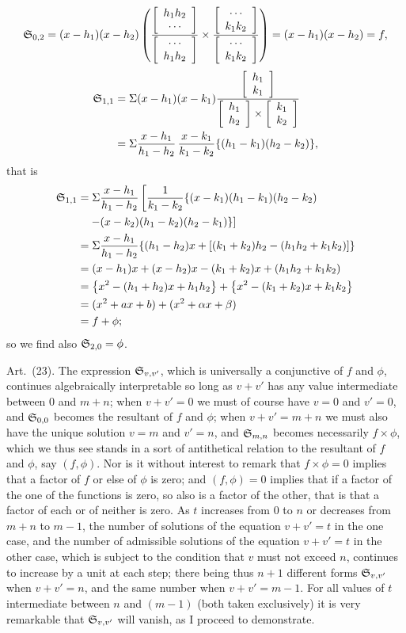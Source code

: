 \documentclass[11pt]{article}
\newcommand{\sourcepage}[1]{\marginpar{\scriptsize p.~#1}}
\newcommand{\art}[1]{\par\smallskip\noindent Art.~(#1).\quad}
\begin{document}
\sourcepage{469}
\[
\mathfrak{S}_{0,2}=(x-h_1)(x-h_2)
\left(\frac{\left[\begin{array}{c}h_1h_2\\\cdots\end{array}\right]}{\left[\begin{array}{c}\cdots\\h_1h_2\end{array}\right]}\times
\frac{\left[\begin{array}{c}\cdots\\k_1k_2\end{array}\right]}{\left[\begin{array}{c}\cdots\\k_1k_2\end{array}\right]}\right)=(x-h_1)(x-h_2)=f,
\]
\[
\begin{aligned}
\mathfrak{S}_{1,1}&=\Sigma(x-h_1)(x-k_1)
\frac{\left[\begin{array}{c}h_1\\k_1\end{array}\right]}{\left[\begin{array}{c}h_1\\h_2\end{array}\right]\times\left[\begin{array}{c}k_1\\k_2\end{array}\right]}\\
&=\Sigma\frac{x-h_1}{h_1-h_2}\,\frac{x-k_1}{k_1-k_2}\{(h_1-k_1)(h_2-k_2)\},
\end{aligned}
\]
that is
\[
\begin{aligned}
\mathfrak{S}_{1,1}
&=\Sigma\frac{x-h_1}{h_1-h_2}\left[\frac1{k_1-k_2}\{(x-k_1)(h_1-k_1)(h_2-k_2)\right.\\
&\quad\left.-(x-k_2)(h_1-k_2)(h_2-k_1)\}\right]\\
&=\Sigma\frac{x-h_1}{h_1-h_2}\{(h_1-h_2)x+[(k_1+k_2)h_2-(h_1h_2+k_1k_2)]\}\\
&=(x-h_1)x+(x-h_2)x-(k_1+k_2)x+(h_1h_2+k_1k_2)\\
&=\bigl\{x^2-(h_1+h_2)x+h_1h_2\bigr\}+\bigl\{x^2-(k_1+k_2)x+k_1k_2\bigr\}\\
&=(x^2+ax+b)+(x^2+\alpha x+\beta)\\
&=f+\phi;
\end{aligned}
\]
so we find also $\mathfrak{S}_{2,0}=\phi$.

\art{23} The expression $\mathfrak{S}_{v,v'}$, which is universally a conjunctive of $f$ and $\phi$, continues algebraically interpretable so long as $v+v'$ has any value intermediate between 0 and $m+n$; when $v+v'=0$ we must of course have $v=0$ and $v'=0$, and $\mathfrak{S}_{0,0}$ becomes the resultant of $f$ and $\phi$; when $v+v'=m+n$ we must also have the unique solution $v=m$ and $v'=n$, and $\mathfrak{S}_{m,n}$ becomes necessarily $f\times\phi$, which we thus see stands in a sort of antithetical relation to the resultant of $f$ and $\phi$, say $(f,\phi)$. Nor is it without interest to remark that $f\times\phi=0$ implies that a factor of $f$ or else of $\phi$ is zero; and $(f,\phi)=0$ implies that if a factor of the one of the functions is zero, so also is a factor of the other, that is that a factor of each or of neither is zero. As $t$ increases from 0 to $n$ or decreases from $m+n$ to $m-1$, the number of solutions of the equation $v+v'=t$ in the one case, and the number of admissible solutions of the equation $v+v'=t$ in the other case, which is subject to the condition that $v$ must not exceed $n$, continues to increase by a unit at each step; there being thus $n+1$ different forms $\mathfrak{S}_{v,v'}$ when $v+v'=n$, and the same number when $v+v'=m-1$. For all values of $t$ intermediate between $n$ and $(m-1)$ (both taken exclusively) it is very remarkable that $\mathfrak{S}_{v,v'}$ will vanish, as I proceed to demonstrate.
\end{document}
